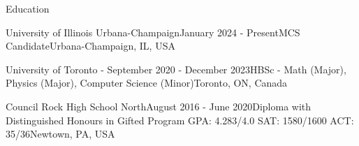 \documentclass[UTF8]{resume} %
\begin{document}
\begin{rSection}{Education}
    
\begin{rSubsection}{University of Illinois Urbana-Champaign}{January 2024 - Present}{MCS Candidate}{Urbana-Champaign, IL, USA}
\end{rSubsection}
\begin{rSubsection}{University of Toronto - }{September 2020 - December 2023}{HBSc - Math (Major), Physics (Major), Computer Science (Minor)}{Toronto, ON, Canada}
\end{rSubsection}
\begin{rSubsection}{Council Rock High School North}{August 2016 - June 2020}{Diploma with Distinguished Honours in Gifted Program GPA: 4.283/4.0  SAT: 1580/1600  ACT: 35/36}{Newtown, PA, USA}

\end{rSubsection}
\end{rSection}
\end{document}
